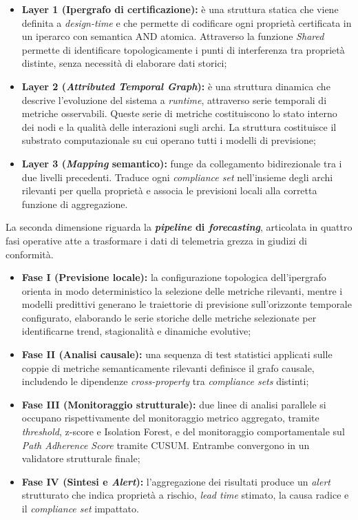 \begin{itemize}
  \item \textbf{Layer 1 (Ipergrafo di certificazione):} è una struttura statica che viene
        definita a \textit{design-time} e che permette di codificare ogni proprietà certificata
        in un iperarco con semantica AND atomica. Attraverso la funzione \textit{Shared} permette
        di identificare topologicamente i punti di interferenza tra proprietà distinte, senza
        necessità di elaborare dati storici;
  \item \textbf{Layer 2 (\textit{Attributed Temporal Graph}):} è una struttura dinamica che
        descrive l'evoluzione del sistema a \textit{runtime}, attraverso serie temporali di
        metriche osservabili. Queste serie di metriche costituiscono lo stato interno dei nodi
        e la qualità delle interazioni sugli archi. La struttura costituisce il substrato
        computazionale su cui operano tutti i modelli di previsione;
  \item \textbf{Layer 3 (\textit{Mapping} semantico):} funge da collegamento bidirezionale tra
        i due livelli precedenti. Traduce ogni \textit{compliance set} nell'insieme degli archi
        rilevanti per quella proprietà e associa le previsioni locali alla corretta funzione di
        aggregazione.
\end{itemize}

La seconda dimensione riguarda la \textbf{\textit{pipeline} di \textit{forecasting}},
articolata in quattro fasi operative atte a trasformare i dati di telemetria grezza in giudizi
di conformità.

\begin{itemize}
  \item \textbf{Fase I (Previsione locale):} la configurazione topologica dell'ipergrafo orienta
        in modo deterministico la selezione delle metriche rilevanti, mentre i modelli predittivi
        generano le traiettorie di previsione sull'orizzonte temporale configurato, elaborando le 
        serie storiche delle metriche selezionate per identificarne trend, stagionalità e dinamiche evolutive;
  \item \textbf{Fase II (Analisi causale):} una sequenza di test statistici applicati sulle coppie
        di metriche semanticamente rilevanti definisce il grafo causale, includendo le dipendenze
        \textit{cross-property} tra \textit{compliance sets} distinti;
  \item \textbf{Fase III (Monitoraggio strutturale):} due linee di analisi parallele si occupano
        rispettivamente del monitoraggio metrico aggregato, tramite \textit{threshold}, z-score e
        Isolation Forest, e del monitoraggio comportamentale sul \textit{Path Adherence Score}
        tramite \gls{CUSUM}. Entrambe convergono in un validatore strutturale finale;
  \item \textbf{Fase IV (Sintesi e \textit{Alert}):} l'aggregazione dei risultati produce un
        \textit{alert} strutturato che indica proprietà a rischio, \textit{lead time} stimato, la
        causa radice e il \textit{compliance set} impattato.
\end{itemize}

